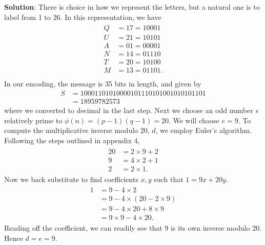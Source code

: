 \documentclass{book}
\begin{document}
    \textbf{Solution}: There is choice in how we represent the letters, but a natural one is to label from 1 to 26. In this representation, we have
    \begin{align}
    \begin{aligned}
        Q &= 17 = 10001 \\
        U &= 21 = 10101 \\
        A &= 01 = 00001 \\
        N &= 14 = 01110 \\
        T &= 20 = 10100 \\
        M &= 13 = 01101. \\
    \end{aligned}
    \end{align}
    In our encoding, the message is 35 bits in length, and given by
    \begin{align} \label{message}
        S &= 10001101010000101110101001010101101 \\
        &= 18959782573
    \end{align}
    where we converted to decimal in the last step. Next we choose an odd number $e$ relatively prime to $\phi(n) = (p-1)(q-1) = 20$. We will choose $e=9$. To compute the multiplicative inverse modulo 20, $d$, we employ Euler's algorithm. Following the steps outlined in appendix 4,
    \begin{align}
    \begin{aligned}
        20 &= 2\times 9 + 2 \\
        9 &= 4\times2 + 1 \\
        2 &= 2\times 1.
    \end{aligned}
    \end{align}
    Now we back substitute to find coefficients $x, y$ such that $1 = 9x + 20y$.
    \begin{align}
    \begin{aligned}
        1 &= 9-4\times 2 \\
        &= 9-4\times (20-2\times 9) \\
        &= 9 - 4\times 20 + 8\times 9 \\
        &= 9\times 9 -4\times 20.
    \end{aligned}
    \end{align}
    Reading off the coefficient, we can readily see that 9 is its own inverse modulo 20. Hence $d=e=9$. 
    
\end{document}
